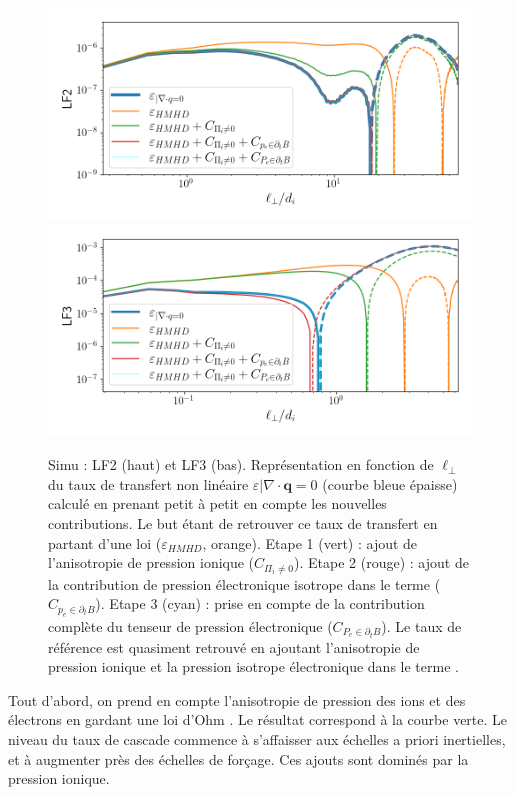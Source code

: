 \begin{figure}[!ht]
 \centering
\includegraphics[width=0.9\linewidth,trim=1cm 1cm 0cm 1cm, clip=true]{./Mainmatter/Part_3/images_ch4/LF2_detail}
\includegraphics[width=0.9\linewidth,trim=1cm 1cm 0cm 1cm, clip=true]{./Mainmatter/Part_3/images_ch4/LF3_detail}
\cprotect\caption{Simu : LF2 (haut) et LF3 (bas). Représentation  en fonction de \ensuremath{\ell_{\perp}} du taux de transfert non linéaire \ensuremath{\varepsilon|\nabla \cdot \boldsymbol{q} = 0} (courbe bleue épaisse) calculé en prenant petit à petit en compte les nouvelles contributions. Le but étant de retrouver ce taux de transfert en partant d'une loi  (\ensuremath{\varepsilon_{HMHD}}, orange). Etape 1 (vert) : ajout de l'anisotropie de pression ionique (\ensuremath{C_{\Pi_i \neq 0}}). Etape 2 (rouge) : ajout de la contribution de pression électronique isotrope dans le terme  (\ensuremath{C_{p_e \in \partial_t B}}). Etape 3 (cyan) : prise en compte de la contribution complète du tenseur de pression électronique (\ensuremath{C_{P_e \in \partial_t B}}). Le taux de référence est quasiment retrouvé en ajoutant l'anisotropie de pression ionique et la pression isotrope électronique dans le terme .}
\label{fig:LF_detail}
\end{figure} 

 Tout d'abord, on prend en compte l'anisotropie de pression des ions et des électrons en gardant une loi d'Ohm . Le résultat correspond à la courbe verte. Le niveau du taux de cascade commence à s'affaisser aux échelles a priori inertielles, et à augmenter près des échelles de forçage. Ces ajouts sont dominés par la pression ionique.

